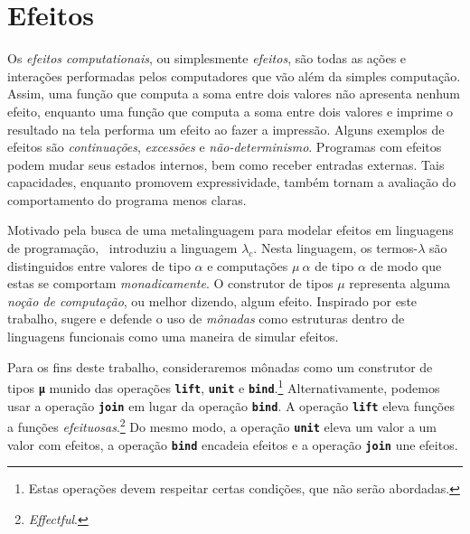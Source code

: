 \section{Efeitos}

Os \emph{efeitos computationais}, ou simplesmente \emph{efeitos}, são todas as ações e interações performadas pelos computadores que vão além da simples computação.
Assim, uma função que computa a soma entre dois valores não apresenta nenhum efeito, enquanto uma função que computa a soma entre dois valores e imprime o resultado na tela performa um efeito ao fazer a impressão.
Alguns exemplos de efeitos são \emph{continuações}, \emph{excessões} e \emph{não-determinismo}.
Programas com efeitos podem mudar seus estados internos, bem como receber entradas externas.
Tais capacidades, enquanto promovem expressividade, também tornam a avaliação do comportamento do programa menos claras.

\vspace{.5\baselineskip}
Motivado pela busca de uma metalinguagem para modelar efeitos em linguagens de programação,~\cite{Moggi.1991} introduziu a linguagem $\lambda_c$.
Nesta linguagem, os termos-$\lambda$ são distinguidos entre valores de tipo $\alpha$ e computações $\mu\ \alpha$ de tipo $\alpha$ de modo que estas se comportam \emph{monadicamente}.
O construtor de tipos $\mu$ representa alguma \emph{noção de computação}, ou melhor dizendo, algum efeito.
Inspirado por este trabalho, \cite{Wadler.1993} sugere e defende o uso de \emph{mônadas} como estruturas dentro de linguagens funcionais como uma maneira de simular efeitos.

\vspace{.5\baselineskip}
Para os fins deste trabalho, consideraremos mônadas como um construtor de tipos {\footnotesize\texttt{\textbf{μ}}} munido das operações {\footnotesize\texttt{\textbf{lift}}}, {\footnotesize\texttt{\textbf{unit}}} e {\footnotesize\texttt{\textbf{bind}}}.\footnote{Estas operações devem respeitar certas condições, que não serão abordadas.}
Alternativamente, podemos usar a operação {\footnotesize\texttt{\textbf{join}}} em lugar da operação {\footnotesize\texttt{\textbf{bind}}}.
A operação {\footnotesize\texttt{\textbf{lift}}} eleva funções a funções \emph{efeituosas}.\footnote{\emph{Effectful}.}
Do mesmo modo, a operação {\footnotesize\texttt{\textbf{unit}}} eleva um valor a um valor com efeitos, a operação {\footnotesize\texttt{\textbf{bind}}} encadeia efeitos e a operação {\footnotesize\texttt{\textbf{join}}} une efeitos.

